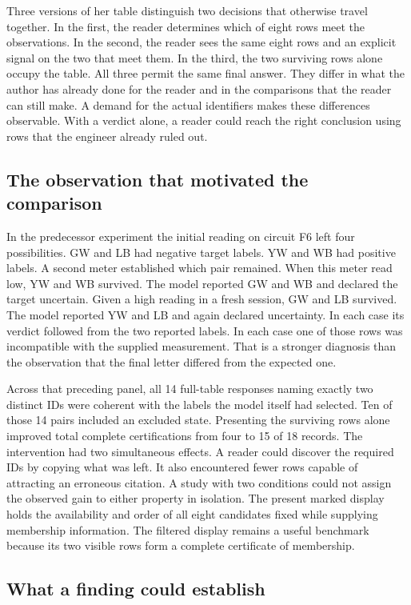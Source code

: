\documentclass[12pt,letterpaper]{article}
\begin{document}
Three versions of her table distinguish two decisions that otherwise travel together. In the first, the reader determines which of eight rows meet the observations. In the second, the reader sees the same eight rows and an explicit signal on the two that meet them. In the third, the two surviving rows alone occupy the table. All three permit the same final answer. They differ in what the author has already done for the reader and in the comparisons that the reader can still make. A demand for the actual identifiers makes these differences observable. With a verdict alone, a reader could reach the right conclusion using rows that the engineer already ruled out.

\subsection{The observation that motivated the comparison}

In the predecessor experiment the initial reading on circuit F6 left four possibilities. GW and LB had negative target labels. YW and WB had positive labels. A second meter established which pair remained. When this meter read low, YW and WB survived. The model reported GW and WB and declared the target uncertain. Given a high reading in a fresh session, GW and LB survived. The model reported YW and LB and again declared uncertainty. In each case its verdict followed from the two reported labels. In each case one of those rows was incompatible with the supplied measurement. That is a stronger diagnosis than the observation that the final letter differed from the expected one.

Across that preceding panel, all 14 full-table responses naming exactly two distinct IDs were coherent with the labels the model itself had selected. Ten of those 14 pairs included an excluded state. Presenting the surviving rows alone improved total complete certifications from four to 15 of 18 records. The intervention had two simultaneous effects. A reader could discover the required IDs by copying what was left. It also encountered fewer rows capable of attracting an erroneous citation. A study with two conditions could not assign the observed gain to either property in isolation. The present marked display holds the availability and order of all eight candidates fixed while supplying membership information. The filtered display remains a useful benchmark because its two visible rows form a complete certificate of membership.

\subsection{What a finding could establish}
\end{document}
